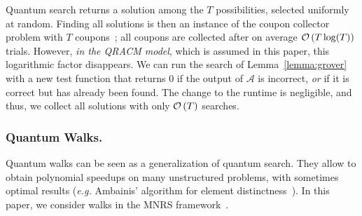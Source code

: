 \begin{remark}\label{remark:coupon-coll}
Quantum search returns a solution among the $T$ possibilities, selected uniformly at random. Finding all solutions is then an instance of the coupon collector problem with $T$ coupons~\cite{newman1960double}; all coupons are collected after on average $\mathcal{O} \left(T\log(T) \right)$ trials. However, \emph{in the QRACM model}, which is assumed in this paper, this logarithmic factor disappears. We can run the search of Lemma~\ref{lemma:grover} with a new test function that returns $0$ if the output of $\mathcal{A}$ is incorrect, \emph{or} if it is correct but has already been found. The change to the runtime is negligible, and thus, we collect all solutions with only $\mathcal{O} \left(T \right)$ searches.
\end{remark}


\subsubsection{Quantum Walks.}\label{subsection:mnrs}


Quantum walks can be seen as a generalization of quantum search. They allow to obtain polynomial speedups on many unstructured problems, with sometimes optimal results (\emph{e.g.} Ambainis' algorithm for element distinctness~\cite{DBLP:journals/siamcomp/Ambainis07}). In this paper, we consider walks in the MNRS framework~\cite{mnrs11}.



